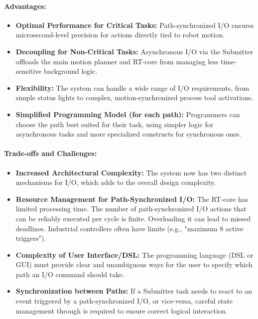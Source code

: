 \paragraph{Advantages:}
\begin{itemize}
    \item \textbf{Optimal Performance for Critical Tasks:} Path-synchronized I/O ensures microsecond-level precision for actions directly tied to robot motion.
    \item \textbf{Decoupling for Non-Critical Tasks:} Asynchronous I/O via the Submitter offloads the main motion planner and RT-core from managing less time-sensitive background logic.
    \item \textbf{Flexibility:} The system can handle a wide range of I/O requirements, from simple status lights to complex, motion-synchronized process tool activations.
    \item \textbf{Simplified Programming Model (for each path):} Programmers can choose the path best suited for their task, using simpler logic for asynchronous tasks and more specialized constructs for synchronous ones.
\end{itemize}

\paragraph{Trade-offs and Challenges:}
\begin{itemize}
    \item \textbf{Increased Architectural Complexity:} The system now has two distinct mechanisms for I/O, which adds to the overall design complexity.
    \item \textbf{Resource Management for Path-Synchronized I/O:} The RT-core has limited processing time. The number of path-synchronized I/O actions that can be reliably executed per cycle is finite. Overloading it can lead to missed deadlines. Industrial controllers often have limits (e.g., "maximum 8 active triggers").
    \item \textbf{Complexity of User Interface/DSL:} The programming language (DSL or GUI) must provide clear and unambiguous ways for the user to specify which path an I/O command should take.
    \item \textbf{Synchronization between Paths:} If a Submitter task needs to react to an event triggered by a path-synchronized I/O, or vice-versa, careful state management through  is required to ensure correct logical interaction.
\end{itemize}

